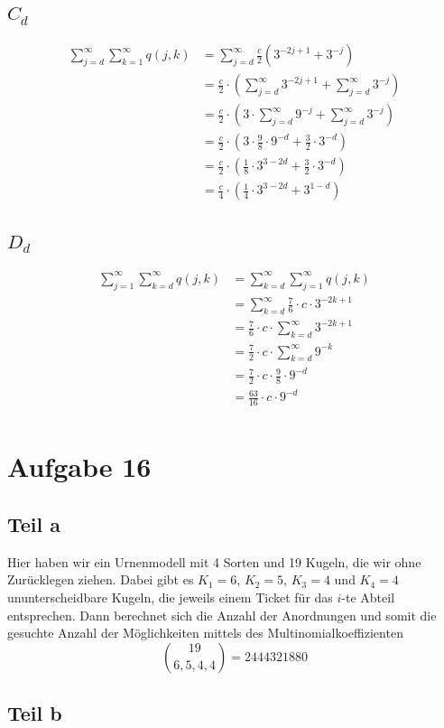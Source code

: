 \documentclass[10pt,a4paper]{article}
\begin{document}
\subsection{$C_{d}$}
\begin{align*}
  \sum_{j = d}^{\infty} \sum_{k = 1}^{\infty} q(j, k) & = \sum_{j = d}^{\infty} \frac{c}{2} \left( 3^{-2j + 1} + 3^{-j} \right)\\
  & = \frac{c}{2} \cdot \left( \sum_{j = d}^{\infty} 3^{-2j + 1} + \sum_{j = d}^{\infty} 3^{-j} \right)\\
  & = \frac{c}{2} \cdot \left( 3 \cdot \sum_{j = d}^{\infty} 9^{-j} + \sum_{j = d}^{\infty} 3^{-j} \right)\\
  & = \frac{c}{2} \cdot \left( 3 \cdot \frac{9}{8} \cdot 9^{-d} + \frac{3}{2} \cdot 3^{-d} \right)\\
  & = \frac{c}{2} \cdot \left( \frac{1}{8} \cdot 3^{3 - 2d} + \frac{3}{2} \cdot 3^{-d} \right)\\
  & = \frac{c}{4} \cdot \left( \frac{1}{4} \cdot 3^{3 - 2d} + 3^{1 - d} \right)\\
\end{align*}

\subsection{$D_{d}$}
\begin{align*}
  \sum_{j = 1}^{\infty} \sum_{k = d}^{\infty} q(j, k) & = \sum_{k = d}^{\infty} \sum_{j = 1}^{\infty} q(j, k)\\
  & = \sum_{k = d}^{\infty} \frac{7}{6} \cdot c \cdot 3^{-2k + 1}\\
  & = \frac{7}{6} \cdot c \cdot \sum_{k = d}^{\infty} 3^{-2k + 1}\\
  & = \frac{7}{2} \cdot c \cdot \sum_{k = d}^{\infty} 9^{-k}\\
  & = \frac{7}{2} \cdot c \cdot \frac{9}{8} \cdot 9^{-d}\\
  & = \frac{63}{16} \cdot c \cdot 9^{-d}\\
\end{align*}

\section{Aufgabe 16}

\subsection{Teil a}
Hier haben wir ein Urnenmodell mit 4 Sorten und 19 Kugeln, die wir ohne Zurücklegen ziehen.
Dabei gibt es $K_{1} = 6$, $K_{2} = 5$, $K_{3} = 4$ und $K_{4} = 4$ ununterscheidbare Kugeln, die jeweils einem Ticket für das $i$-te Abteil entsprechen.
Dann berechnet sich die Anzahl der Anordnungen und somit die gesuchte Anzahl der Möglichkeiten mittels des Multinomialkoeffizienten
\begin{equation}
  \binom{19}{6, 5, 4, 4} = 2444321880
\end{equation}

\subsection{Teil b}
\end{document}
